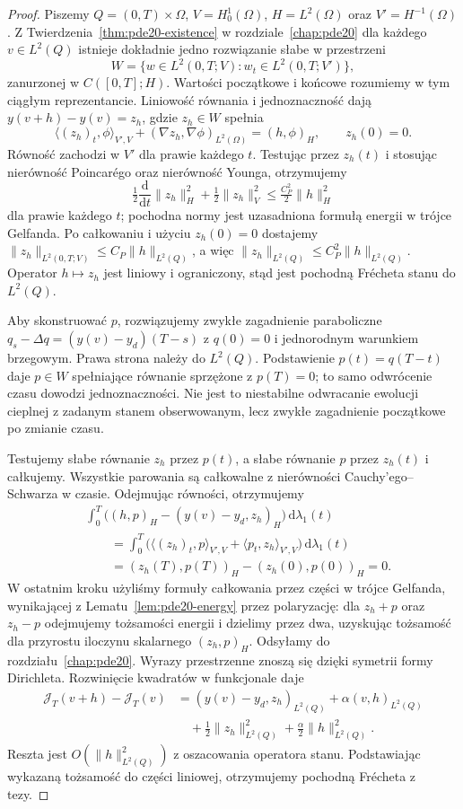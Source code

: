 \begin{proof}
Piszemy $Q=(0,T)\times\Omega$, $V=H_0^1(\Omega)$,
$H=L^2(\Omega)$ oraz $V'=H^{-1}(\Omega)$.
Z Twierdzenia~\ref{thm:pde20-existence}
w rozdziale~\ref{chap:pde20}
dla każdego $v\in L^2(Q)$ istnieje dokładnie jedno
rozwiązanie słabe w przestrzeni
\[
 W=\{w\in L^2(0,T;V):w_t\in L^2(0,T;V')\},
\]
zanurzonej w $C([0,T];H)$. Wartości początkowe
i końcowe rozumiemy w tym ciągłym reprezentancie.
Liniowość równania i jednoznaczność dają
$y(v+h)-y(v)=z_h$, gdzie $z_h\in W$ spełnia
\[
 \langle(z_h)_t,\phi\rangle_{V',V}
 +(\nabla z_h,\nabla\phi)_{L^2(\Omega)}
 =(h,\phi)_H,\qquad z_h(0)=0.
\]
Równość zachodzi w $V'$ dla prawie każdego $t$.
Testując przez $z_h(t)$ i stosując nierówność
Poincarégo oraz nierówność Younga, otrzymujemy
\[
 \tfrac12\frac{\mathrm d}{\mathrm dt}\|z_h\|_H^2
 +\tfrac12\|z_h\|_V^2
 \le\tfrac{C_P^2}{2}\|h\|_H^2
\]
dla prawie każdego $t$; pochodna normy jest
uzasadniona formułą energii w trójce Gelfanda.
Po całkowaniu i użyciu $z_h(0)=0$ dostajemy
$\|z_h\|_{L^2(0,T;V)}\le C_P\|h\|_{L^2(Q)}$,
a więc $\|z_h\|_{L^2(Q)}\le C_P^2\|h\|_{L^2(Q)}$.
Operator $h\mapsto z_h$ jest liniowy i ograniczony,
stąd jest pochodną Frécheta stanu do $L^2(Q)$.

Aby skonstruować $p$, rozwiązujemy zwykłe
zagadnienie paraboliczne
$q_s-\Delta q=(y(v)-y_d)(T-s)$ z $q(0)=0$
i jednorodnym warunkiem brzegowym.
Prawa strona należy do $L^2(Q)$.
Podstawienie $p(t)=q(T-t)$ daje $p\in W$
spełniające równanie sprzężone z $p(T)=0$;
to samo odwrócenie czasu dowodzi jednoznaczności.
Nie jest to niestabilne odwracanie ewolucji
cieplnej z zadanym stanem obserwowanym,
lecz zwykłe zagadnienie początkowe po zmianie czasu.

Testujemy słabe równanie $z_h$ przez $p(t)$,
a słabe równanie $p$ przez $z_h(t)$ i całkujemy.
Wszystkie parowania są całkowalne z nierówności
Cauchy'ego--Schwarza w czasie. Odejmując równości,
otrzymujemy
\[
 \begin{aligned}
 &\int_0^T\bigl((h,p)_H-(y(v)-y_d,z_h)_H\bigr)
 \,\mathrm d\lambda_1(t)\\
 &\qquad=\int_0^T
 \bigl(\langle(z_h)_t,p\rangle_{V',V}
 +\langle p_t,z_h\rangle_{V',V}\bigr)
 \,\mathrm d\lambda_1(t)\\
 &\qquad=(z_h(T),p(T))_H-(z_h(0),p(0))_H=0.
 \end{aligned}
\]
W ostatnim kroku użyliśmy formuły całkowania
przez części w trójce Gelfanda, wynikającej
z Lematu~\ref{lem:pde20-energy} przez polaryzację:
dla $z_h+p$ oraz $z_h-p$ odejmujemy tożsamości
energii i dzielimy przez dwa, uzyskując tożsamość
dla przyrostu iloczynu skalarnego $(z_h,p)_H$.
Odsyłamy do rozdziału~\ref{chap:pde20}.
Wyrazy przestrzenne znoszą się
dzięki symetrii formy Dirichleta.
Rozwinięcie kwadratów w funkcjonale daje
\[
 \begin{aligned}
 \mathcal J_T(v+h)-\mathcal J_T(v)
 &= (y(v)-y_d,z_h)_{L^2(Q)}
   +\alpha(v,h)_{L^2(Q)}\\
 &\quad+\tfrac12\|z_h\|_{L^2(Q)}^2+
 \tfrac\alpha2\|h\|_{L^2(Q)}^2 .
 \end{aligned}
\]
Reszta jest $O(\|h\|_{L^2(Q)}^2)$ z oszacowania
operatora stanu. Podstawiając wykazaną tożsamość
do części liniowej, otrzymujemy pochodną Frécheta
z tezy.
\end{proof}

